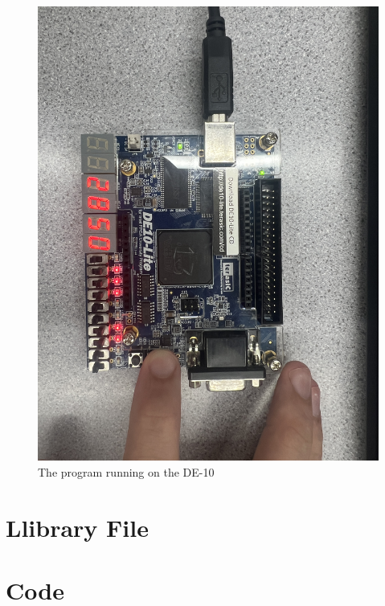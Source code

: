 \documentclass{article}
\begin{document}
\begin{flushleft}
\begin{figure}[!h]
\begin{centering}
      \includegraphics[scale=0.2]{IMG_3758.jpeg}
      \caption{The program running on the DE-10}
    \end{centering}
  \end{figure}
  \section{Llibrary File}
    
  \section{Code}
    
\end{flushleft}
\end{document}
